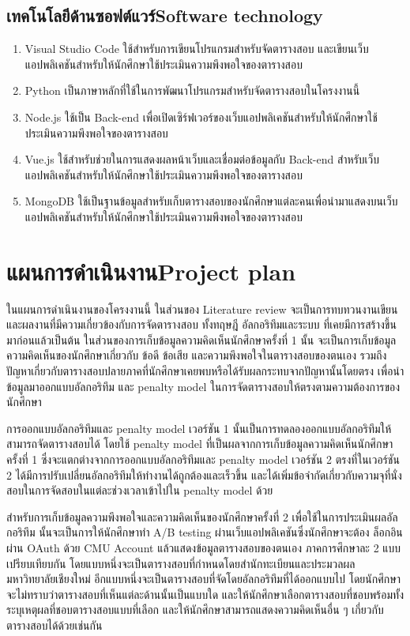 \subsection{\ifcpe เทคโนโลยีด้านซอฟต์แวร์\else Software technology\fi}
\begin{enumerate}
    \item Visual Studio Code ใช้สำหรับการเขียนโปรแกรมสำหรับจัดตารางสอบ และเขียนเว็บแอปพลิเคชันสำหรับให้นักศึกษาใช้ประเมินความพึงพอใจของตารางสอบ
    \item Python เป็นภาษาหลักที่ใช้ในการพัฒนาโปรแกรมสำหรับจัดตารางสอบในโครงงานนี้
    \item Node.js ใช้เป็น Back-end เพื่อเปิดเซิร์ฟเวอร์ของเว็บแอปพลิเคชันสำหรับให้นักศึกษาใช้ประเมินความพึงพอใจของตารางสอบ
    \item Vue.js ใช้สำหรับช่วยในการแสดงผลหน้าเว็บและเชื่อมต่อข้อมูลกับ Back-end สำหรับเว็บแอปพลิเคชันสำหรับให้นักศึกษาใช้ประเมินความพึงพอใจของตารางสอบ
    \item MongoDB ใช้เป็นฐานข้อมูลสำหรับเก็บตารางสอบของนักศึกษาแต่ละคนเพื่อนำมาแสดงบนเว็บแอปพลิเคชันสำหรับให้นักศึกษาใช้ประเมินความพึงพอใจของตารางสอบ
\end{enumerate}

\section{\ifcpe แผนการดำเนินงาน\else Project plan\fi}
ในแผนการดำเนินงานของโครงงานนี้ ในส่วนของ Literature review จะเป็นการทบทวนงานเขียนและผลงานที่มีความเกี่ยวข้องกับการจัดตารางสอบ
ทั้งทฤษฎี อัลกอริทึมและระบบ ที่เคยมีการสร้างขึ้นมาก่อนแล้วเป็นต้น ในส่วนของการเก็บข้อมูลความคิดเห็นนักศึกษาครั้งที่ 1 นั้น
จะเป็นการเก็บข้อมูลความคิดเห็นของนักศึกษาเกี่ยวกับ ข้อดี ข้อเสีย และความพึงพอใจในตารางสอบของตนเอง รวมถึงปัญหาเกี่ยวกับตารางสอบปลายภาคที่นักศึกษาเคยพบหรือได้รับผลกระทบจากปัญหานั้นโดยตรง
เพื่อนำข้อมูลมาออกแบบอัลกอริทึม และ penalty model ในการจัดตารางสอบให้ตรงตามความต้องการของนักศึกษา


การออกแบบอัลกอริทึมและ penalty model เวอร์ชัน 1 นั้นเป็นการทดลองออกแบบอัลกอริทึมให้สามารถจัดตารางสอบได้
โดยใช้ penalty model ที่เป็นผลจากการเก็บข้อมูลความคิดเห็นนักศึกษาครั้งที่ 1 
ซึ่งจะแตกต่างจากการออกแบบอัลกอริทึมและ penalty model เวอร์ชัน 2
ตรงที่ในเวอร์ชัน 2 ได้มีการปรับเปลี่ยนอัลกอริทึมให้ทำงานได้ถูกต้องและเร็วขึ้น และได้เพิ่มข้อจำกัดเกี่ยวกับความจุที่นั่งสอบในการจัดสอบในแต่ละช่วงเวลาเข้าไปใน penalty model ด้วย


สำหรับการเก็บข้อมูลความพึงพอใจและความคิดเห็นของนักศึกษาครั้งที่ 2 เพื่อใช้ในการประเมินผลอัลกอริทึม นั้นจะเป็นการให้นักศึกษาทำ A/B testing 
ผ่านเว็บแอปพลิเคชันซึ่งนักศึกษาจะต้อง
ล็อกอินผ่าน OAuth ด้วย CMU Account แล้วแสดงข้อมูลตารางสอบของตนเอง ภาคการศึกษาละ 2 แบบ เปรียบเทียบกัน
โดยแบบหนึ่งจะเป็นตารางสอบที่กำหนดโดยสำนักทะเบียนและประมวลผล มหาวิทยาลัยเชียงใหม่ 
อีกแบบหนึ่งจะเป็นตารางสอบที่จัดโดยอัลกอริทึมที่ได้ออกแบบไป โดยนักศึกษาจะไม่ทราบว่าตารางสอบที่เห็นแต่ละด้านนั้นเป็นแบบใด และให้นักศึกษาเลือกตารางสอบที่ชอบพร้อมทั้งระบุเหตุผลที่ชอบตารางสอบแบบที่เลือก
และให้นักศึกษาสามารถแสดงความคิดเห็นอื่น ๆ เกี่ยวกับตารางสอบได้ด้วยเช่นกัน

